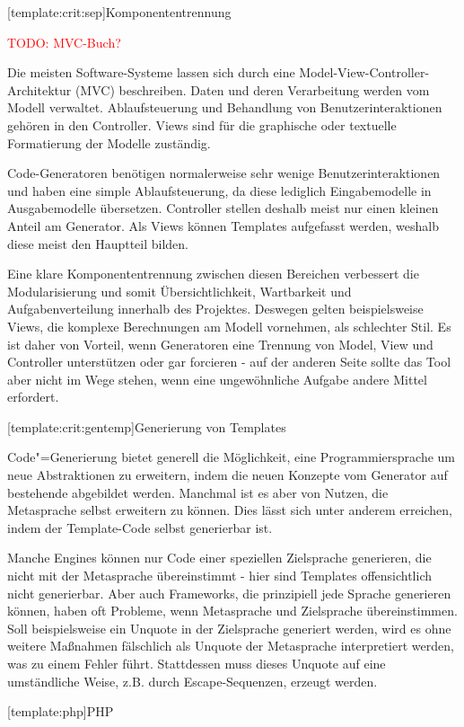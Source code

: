 \documentclass[11pt, a4paper, bibgerm]{scrbook}
\newcommand{\todo}[1]{
  \textcolor{red}{TODO: #1}
}
\newcommand\lsection{}
\newcommand\lsubsection{}
\newcommand{\cgen}{Code"=Generierung}
\begin{document}
\lsubsection[template:crit:sep]{Komponententrennung}
\todo{MVC-Buch?}
Die meisten Software-Systeme lassen sich durch eine
Model-View-Controller-Architektur (MVC) beschreiben. Daten und deren
Verarbeitung werden vom Modell verwaltet. Ablaufsteuerung und Behandlung
von Benutzerinteraktionen gehören in den Controller. Views sind für die
graphische oder textuelle Formatierung der Modelle zuständig.

Code-Generatoren benötigen normalerweise sehr wenige
Benutzerinteraktionen und haben eine simple Ablaufsteuerung, da diese
lediglich Eingabemodelle in Ausgabemodelle übersetzen. Controller
stellen deshalb meist nur einen kleinen Anteil am Generator. Als Views
können Templates aufgefasst werden, weshalb diese meist den Hauptteil
bilden.

Eine klare Komponententrennung zwischen diesen Bereichen verbessert die
Modularisierung und somit Übersichtlichkeit, Wartbarkeit und
Aufgabenverteilung innerhalb des Projektes. Deswegen gelten
beispielsweise Views, die komplexe Berechnungen am Modell vornehmen, als
schlechter Stil. Es ist daher von Vorteil, wenn Generatoren eine
Trennung von Model, View und Controller unterstützen oder gar forcieren
- auf der anderen Seite sollte das Tool aber nicht im Wege stehen, wenn
eine ungewöhnliche Aufgabe andere Mittel erfordert.

\lsubsection[template:crit:gentemp]{Generierung von Templates}

\cgen{} bietet generell die Möglichkeit, eine Programmiersprache um neue
Abstraktionen zu erweitern, indem die neuen Konzepte vom Generator auf
bestehende abgebildet werden. Manchmal ist es aber von Nutzen, die
Metasprache selbst erweitern zu können. Dies lässt sich unter anderem
erreichen, indem der Template-Code selbst generierbar ist.

Manche Engines können nur Code einer speziellen Zielsprache generieren,
die nicht mit der Metasprache übereinstimmt - hier sind Templates
offensichtlich nicht generierbar. Aber auch Frameworks, die prinzipiell
jede Sprache generieren können, haben oft Probleme, wenn Metasprache und
Zielsprache übereinstimmen. Soll beispielsweise ein Unquote in der
Zielsprache generiert werden, wird es ohne weitere Maßnahmen fälschlich
als Unquote der Metasprache interpretiert werden, was zu einem Fehler
führt. Stattdessen muss dieses Unquote auf eine umständliche Weise,
z.B. durch Escape-Sequenzen, erzeugt werden.

\lsection[template:php]{PHP}
\end{document}
